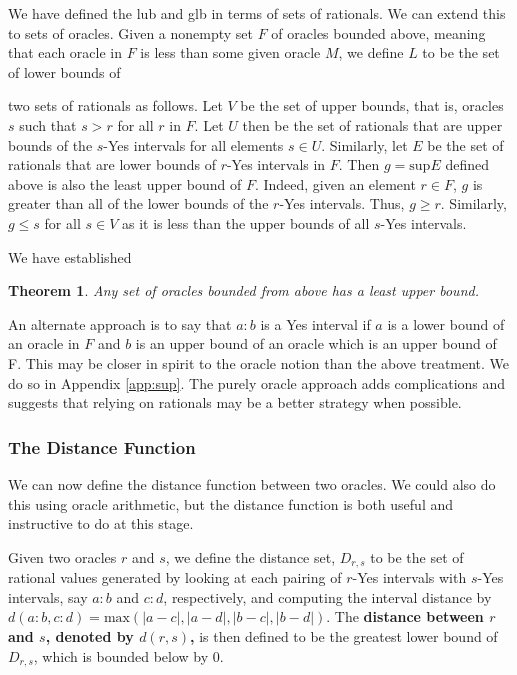 \documentclass[12pt]{article}
\newtheorem{theorem}{Theorem}
\theoremstyle{remark}
\begin{document}
We have defined the lub and glb in terms of sets of rationals. We can extend this to sets of oracles. Given a nonempty set $F$ of oracles bounded above, meaning that each oracle in $F$ is less than some given oracle $M$, we define $L$ to be the set of lower bounds of 

two sets of rationals as follows. Let $V$ be the set of upper bounds, that is, oracles $s$ such that $s > r$ for all $r$ in $F$. Let $U$ then be the set of rationals that are upper bounds of the $s$-Yes intervals for all elements $s \in U$. Similarly, let $E$ be the set of rationals that are lower bounds of $r$-Yes intervals in $F$. Then $g = \mathrm{sup} E$ defined above is also the least upper bound of $F$.  Indeed, given an element $r \in F$, $g$ is greater than all of the lower bounds of the $r$-Yes intervals. Thus, $g \geq r$. Similarly, $g \leq s$ for all $s \in V$ as it is less than the upper bounds of all $s$-Yes intervals. 

We have established

\begin{theorem}\label{th:lub}
Any set of oracles bounded from above has a least upper bound. 
\end{theorem}

An alternate approach is to say that $a:b$ is a Yes interval if $a$ is a lower bound of an oracle in $F$ and $b$ is an upper bound of an oracle which is an upper bound of F. This may be closer in spirit to the oracle notion than the above treatment. We do so in Appendix \ref{app:sup}. The purely oracle approach adds complications and suggests that relying on rationals may be a better strategy when possible. 

\subsubsection{The Distance Function}

We can now define the distance function between two oracles. We could also do this using oracle arithmetic, but the distance function is both useful and instructive to do at this stage. 

Given two oracles $r$ and $s$, we define the distance set, $D_{r,s}$ to be the set of rational values generated by looking at each pairing of $r$-Yes intervals with $s$-Yes intervals, say  $a:b$ and $c:d$, respectively, and computing the interval distance by $d(a:b,c:d) = \mathrm{max}(|a-c|, |a-d|,|b-c|,|b-d|)$. The \textbf{distance between $r$ and $s$, denoted by $d(r,s)$,} is then defined to be the greatest lower bound of $D_{r,s}$, which is bounded below by 0. 
\end{document}
